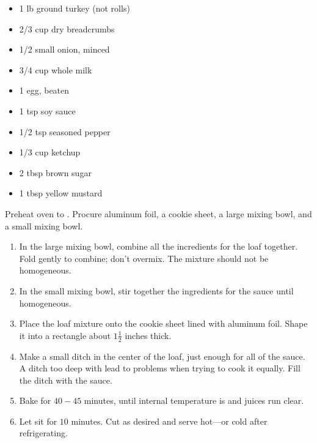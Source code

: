 \documentclass{article}
\begin{document}
\thispagestyle{firstpage}

\ingredients
\begin{multicols}{2}
\begin{itemize}
    \item 1 lb ground turkey (not rolls)
    \item 2/3 cup dry breadcrumbs
    \item 1/2 small onion, minced
    \item 3/4 cup whole milk
    \item 1 egg, beaten
    \item 1 tsp soy sauce
    \item 1/2 tsp seasoned pepper
\end{itemize}
\columnbreak
{}
\begin{itemize}
    \item 1/3 cup ketchup
    \item 2 tbsp brown sugar
    \item 1 tbsp yellow mustard
\end{itemize}
\end{multicols}

\instructions
Preheat oven to . Procure aluminum foil, a cookie sheet, a large mixing bowl, and a small mixing bowl.
\begin{enumerate}
    \item In the large mixing bowl, combine all the incredients for the loaf together. Fold gently to combine; don't overmix. The mixture should not be homogeneous.
    \item In the small mixing bowl, stir together the ingredients for the sauce until homogeneous.
    \item Place the loaf mixture onto the cookie sheet lined with aluminum foil. Shape it into a rectangle about $1\frac{1}{2}$ inches thick.
    \item Make a small ditch in the center of the loaf, just enough for all of the sauce. A ditch too deep with lead to problems when trying to cook it equally. Fill the ditch with the sauce.
    \item Bake for $40-45$ minutes, until internal temperature is  and juices run clear.
    \item Let sit for $10$ minutes. Cut as desired and serve hot---or cold after refrigerating.
\end{enumerate}
\end{document}
